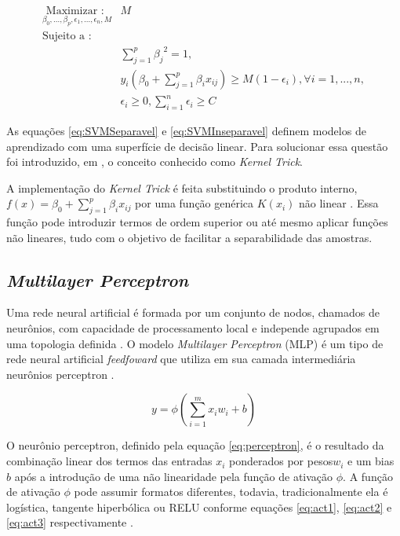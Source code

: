\begin{equation}
\begin{split}
\underset {\beta_0, ..., \beta_p, \epsilon_1, ..., \epsilon_n, M}  {\text{Maximizar : }} &{M} \\
\text{Sujeito a : } \\
&\sum_{j=1}^{p}{{\beta_j}^2} = 1, \\
&y_i(\beta_0 + \sum_{j=1}^{p}{{\beta_i x_{ij}}}) \geq M(1 - \epsilon_i), \forall i = 1, ..., n, \\
&\epsilon_i \geq 0,  \sum_{i=1}^{n}{\epsilon_i} \geq C
\end{split}
\label{eq:SVMInseparavel}
\end{equation}

As equações \ref{eq:SVMSeparavel} e \ref{eq:SVMInseparavel} definem modelos de aprendizado com uma superfície de decisão linear. Para solucionar essa questão foi introduzido, em  , o conceito conhecido como \textit{Kernel Trick}.

A implementação do \textit{Kernel Trick} é feita substituindo o produto interno, $f(x) = \beta_0 + \sum_{j=1}^{p}{{\beta_i x_{ij}}}$ por uma função genérica $K(x_i)$ não linear \cite{James20131}. Essa função pode introduzir termos de ordem superior ou até mesmo aplicar funções não lineares, tudo com o objetivo de facilitar a separabilidade das amostras. 
	
\subsection{\textit{Multilayer Perceptron}}
\label{sssec:MLPClassificationSubSection}
Uma rede neural artificial é formada por um conjunto de nodos, chamados de neurônios, com capacidade de processamento local e independe agrupados em uma topologia definida \cite{Braga2007}.  O modelo \textit{Multilayer Perceptron} (MLP) é um tipo de rede neural artificial \textit{feedfoward} que utiliza em sua camada intermediária neurônios perceptron \cite{AbadiABBCCCDDDG16}. 

\begin{equation}
y = \phi(\sum_{i = 1}^{m}{x_i  w_i} + b)
\label{eq:perceptron}
\end{equation}

O neurônio perceptron, definido pela equação \ref{eq:perceptron}, é o resultado da combinação linear dos termos das entradas $x_i$ ponderados por pesos$w_i$ e um bias $b$ após a introdução de uma não linearidade pela função de ativação $\phi$. A função de ativação $\phi$ pode assumir formatos diferentes, todavia, tradicionalmente ela é logística, tangente hiperbólica ou RELU conforme equações \ref{eq:act1}, \ref{eq:act2} e \ref{eq:act3} respectivamente \cite{Goodfellow-et-al-2016}.

